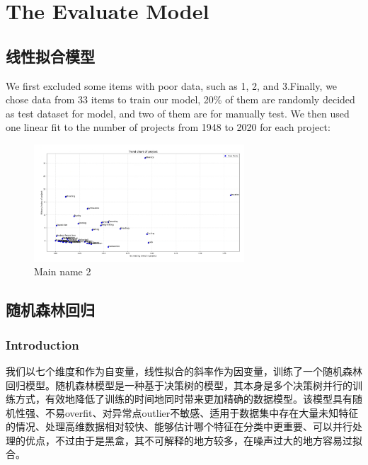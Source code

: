 \documentclass[a4paper]{article}
\begin{document}
\section{The Evaluate Model}
\subsection{线性拟合模型}
We first excluded some items with poor data, such as 1, 2, and 3.Finally, we chose data from 33 items to train our model, 20\% of them are randomly decided as test dataset for model, and two of them are for manually test.
We then used one linear fit to the number of projects from 1948 to 2020 for each project:
\captionsetup[listing]{labelformat=empty}
\begin{figure}[H] %
    \centering %
    \includegraphics[width=0.7\textwidth]{TrendChartOfProject} %
    \caption{Main name 2} %
    \label{Fig.main2} %
    \end{figure}

\subsection{随机森林回归}
\subsubsection{Introduction}

我们以七个维度和作为自变量，线性拟合的斜率作为因变量，训练了一个随机森林回归模型。随机森林模型是一种基于决策树的模型，其本身是多个决策树并行的训练方式，有效地降低了训练的时间地同时带来更加精确的数据模型。该模型具有随机性强、不易overfit、对异常点outlier不敏感、适用于数据集中存在大量未知特征的情况、处理高维数据相对较快、能够估计哪个特征在分类中更重要、可以并行处理的优点，不过由于是黑盒，其不可解释的地方较多，在噪声过大的地方容易过拟合。
\end{document}

